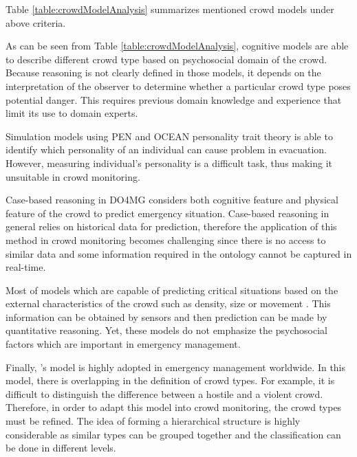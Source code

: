 Table \ref{table:crowdModelAnalysis} summarizes mentioned crowd models under above criteria. 

As can be seen from Table \ref{table:crowdModelAnalysis}, cognitive models \citep{Blumer1951,Lofland1985,Momboisse1967} are able to describe different crowd type based on psychosocial domain of the crowd. Because reasoning is not clearly defined in those models, it depends on the interpretation of the observer to determine whether a particular crowd type poses potential danger. This requires previous domain knowledge and experience that limit its use to domain experts.

Simulation models using PEN \citep{Guy2011} and OCEAN \citep{Durupinar2008} personality trait theory is able to identify which personality of an individual can cause problem in evacuation. However, measuring individual’s personality is a difficult task, thus making it unsuitable in crowd monitoring.

Case-based reasoning in DO4MG \citep{DelirHaghighi2013a} considers both cognitive feature and physical feature of the crowd to predict emergency situation. Case-based reasoning in general relies on historical data for prediction, therefore the application of this method in crowd monitoring becomes challenging since there is no access to similar data and some information required in the ontology cannot be captured in real-time.

Most of models which are capable of predicting critical situations based on the external characteristics of the crowd such as density, size or movement \citep{Helbing2007,Lee2005}. This information can be obtained by sensors and then prediction can be made by quantitative reasoning. Yet, these models do not emphasize the psychosocial factors which are important in emergency management.

Finally, \citet{Berlonghi1995}’s model is highly adopted in emergency management worldwide. In this model, there is overlapping in the definition of crowd types. For example, it is difficult to distinguish the difference between a hostile and a violent crowd. Therefore, in order to adapt this model into crowd monitoring, the crowd types must be refined. The idea of forming a hierarchical structure \citep{Brown1954,Forsyth2009} is highly considerable as similar types can be grouped together and the classification can be done in different levels.

